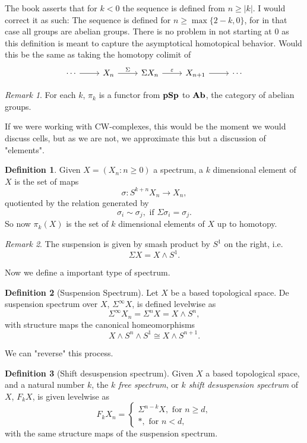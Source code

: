 \documentclass[a4paper,english,11pt]{article}
\theoremstyle{definition}
\newtheorem{Def}{Definition}
\theoremstyle{plain}
\theoremstyle{remark}
\newtheorem{rem}{\color{red}Remark}
\newcommand{\pSp}{\textbf{\text{pSp}}}
\newcommand{\Ab}{\textbf{\text{Ab}}}
\newcommand{\Susp}{\Sigma^{\infty}}
\begin{document}
The book asserts that for \(k<0\) the sequence is defined from \(n\geq|k|\). I would correct it as such: 
{\color{purple} The sequence is defined for \(n\geq \max\{2-k,0\}\), for in that case all groups are abelian groups}. 
There is no problem in not starting at \(0\) as this definition is meant to capture the asymptotical homotopical behavior. Would this be the same as taking the homotopy colimit of
\begin{equation}
  \label{hip1}
  \begin{tikzcd}
    \cdots\arrow{r}& X_n \arrow{r}{\Sigma}&\Sigma X_n\arrow{r}{\varepsilon}&X_{n+1}\arrow{r}&\cdots
  \end{tikzcd}
\end{equation}
\begin{rem}
  For each \(k\), \(\pi_k\) is a functor from \(\pSp\) to \(\Ab\), the category of abelian groups.
\end{rem} 
If we were working with CW-complexes, this would be the moment we would discuss cells, but as we are not, we approximate this but a discussion of "elements".
\begin{Def}
  Given \(X=(X_n:n\geq 0)\) a spectrum, a \(k\) dimensional element of \(X\) is the set of maps
  \[\sigma:S^{k+n}X_n\to X_n,\]
  quotiented by the relation generated by
  \[\sigma_i\sim\sigma_j, \text{ if } \Sigma\sigma_i=\sigma_j.\]
  So now \(\pi_k(X)\) is the set of \(k\) dimensional elements of \(X\) up to homotopy.
\end{Def}  
\begin{rem}
  The suspension is given by smash product by \(S^1\) {\color{red} on the right}, i.e.
  \[\Sigma X=X\wedge S^1.\]
\end{rem}
Now we define a important type of spectrum.
\begin{Def}[Suspension Spectrum]
  Let \(X\) be a based topological space. De suspension spectrum over \(X\), \(\Susp X\), is defined levelwise as 
  \[\Susp X_n=\Sigma^{n}X=X\wedge S^n,\]
  with structure maps the canonical homeomorphisms
  \[X\wedge S^n\wedge S^1 \cong X\wedge S^{n+1}.\]
\end{Def}
We can "reverse" this process.
\begin{Def}[Shift desuspension spectrum]
  Given \(X\) a based topological space, and a natural number \(k\), the \textit{ \(k\) free spectrum}, or \textit{\(k\) shift desuspension spectrum} of \(X\), \(F_k X\), is given levelwise as
  \[F_kX_n=\begin{cases}
    \Sigma^{n-k}X,\text{ for }n\geq d,\\
    \ast,\text{ for } n<d,
  \end{cases}\]
  with the same structure maps of the suspension spectrum. 
\end{Def}  
\end{document}
